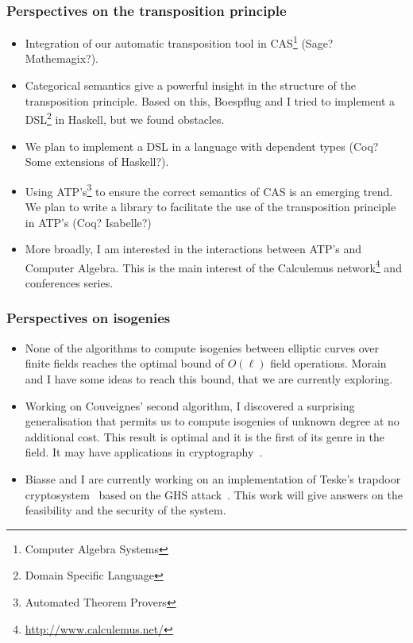 \documentclass[10pt]{beamer}
\newcommand{\0}{\mathcal{O}}  %
\begin{document}
\begin{frame}
  \frametitle{Perspectives on the transposition principle}

  \begin{itemize}
  \item Integration of our automatic transposition tool in
    CAS\footnote{Computer Algebra Systems} (Sage?  Mathemagix?).
  \item Categorical semantics give a powerful insight in the structure
    of the transposition principle. Based on this, Boespflug and I
    tried to implement a DSL\footnote{Domain Specific Language} in
    Haskell, but we found obstacles.
  \item We plan to implement a DSL in a language with
    dependent types (Coq? Some extensions of Haskell?).
  \item Using ATP's\footnote{Automated Theorem Provers} to ensure the
    correct semantics of CAS is an emerging trend. We plan to write a
    library to facilitate the use of the transposition principle in
    ATP's (Coq? Isabelle?)
  \item More broadly, I am interested in the interactions between
    ATP's and Computer Algebra. This is the main interest of the
    Calculemus
    network\footnote{\protect\url{http://www.calculemus.net/}} and
    conferences series.
  \end{itemize}
\end{frame}


\begin{frame}
  \frametitle{Perspectives on isogenies}
  
  \begin{itemize}
  \item None of the algorithms to compute isogenies between elliptic
    curves over finite fields reaches the optimal bound of $O(\ell)$
    field operations.  Morain and I have some ideas to reach this
    bound, that we are currently exploring.
  \item Working on Couveignes' second algorithm, I discovered a
    surprising generalisation that permits us to compute isogenies of
    unknown degree at no additional cost. This result is optimal and
    it is the first of its genre in the field. It may have
    applications in
    cryptography~\cite{teske06,rostovtsev+stolbunov06}.
  \item Biasse and I are currently working on an implementation of
    Teske's trapdoor cryptosystem~\cite{teske06} based on the GHS
    attack~\cite{gaudry+hess+smart02,GHS}. This work will give answers
    on the feasibility and the security of the system.
  \end{itemize}
\end{frame}
\end{document}
